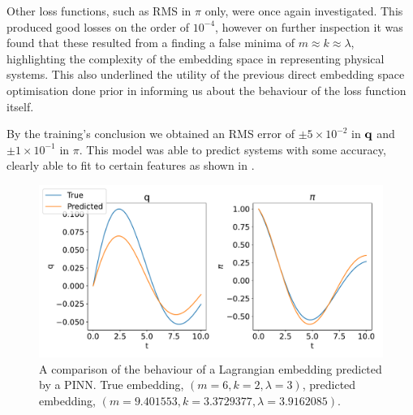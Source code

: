 Other loss functions, such as RMS in $\pi$ only, were once again investigated. This produced good losses on the order of $10^{-4}$, however on further inspection it was found that these resulted from a finding a false minima of $m \approx k \approx \lambda$, highlighting the complexity of the embedding space in representing physical systems. This also underlined the utility of the previous direct embedding space optimisation done prior in informing us about the behaviour of the loss function itself.

By the training's conclusion we obtained an RMS error of $\pm 5 \times 10^{-2}$ in $\vb{q}$ and $\pm 1 \times 10 ^{-1}$ in $\pi$. This model was able to predict systems with some accuracy, clearly able to fit to certain features as shown in .

\begin{figure}[t]
  \label{fig:model-prediction}
  \includegraphics[width=\columnwidth]{figures/model-predictions.pdf}
  \caption{A comparison of the behaviour of a Lagrangian embedding predicted by a PINN. True embedding, $(m = 6, k = 2, \lambda = 3)$, predicted embedding, $(m = 9.401553,  k = 3.3729377, \lambda = 3.9162085)$.}
\end{figure}

